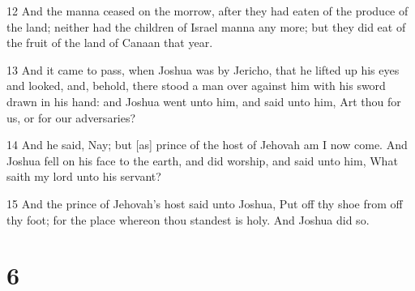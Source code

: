\par 12 And the manna ceased on the morrow, after they had eaten of the produce of the land; neither had the children of Israel manna any more; but they did eat of the fruit of the land of Canaan that year.
\par 13 And it came to pass, when Joshua was by Jericho, that he lifted up his eyes and looked, and, behold, there stood a man over against him with his sword drawn in his hand: and Joshua went unto him, and said unto him, Art thou for us, or for our adversaries?
\par 14 And he said, Nay; but [as] prince of the host of Jehovah am I now come. And Joshua fell on his face to the earth, and did worship, and said unto him, What saith my lord unto his servant?
\par 15 And the prince of Jehovah's host said unto Joshua, Put off thy shoe from off thy foot; for the place whereon thou standest is holy. And Joshua did so.

\chapter{6}

